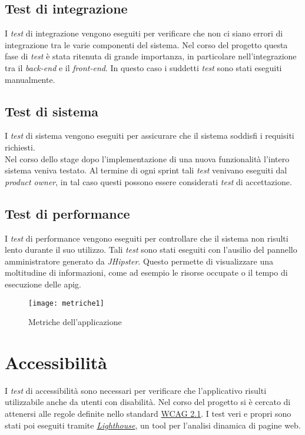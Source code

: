 \subsection{Test di integrazione}
I \textit{test} di integrazione vengono eseguiti per verificare che non ci siano errori di integrazione tra le varie componenti del sistema. Nel corso del progetto questa fase di \textit{test} è stata ritenuta di grande importanza, in particolare nell'integrazione tra il \textit{back-end} e il \textit{front-end}. In questo caso i suddetti \textit{test} sono stati eseguiti manualmente. 

\subsection{Test di sistema}
I \textit{test} di sistema vengono eseguiti per assicurare che il sistema soddisfi i requisiti richiesti. \\Nel corso dello stage dopo l'implementazione di una nuova funzionalità l'intero sistema veniva testato. Al termine di ogni sprint tali \textit{test} venivano eseguiti dal \textit{product owner}, in tal caso questi possono essere considerati \textit{test} di accettazione.

\subsection{Test di performance}
I \textit{test} di performance vengono eseguiti per controllare che il sistema non risulti lento durante il suo utilizzo. Tali \textit{test} sono stati eseguiti con l'ausilio del pannello amministratore generato da \textit{JHipster}. Questo permette di visualizzare una moltitudine di informazioni, come ad esempio le risorse occupate o il tempo di esecuzione delle \gls{apig}.
\begin{figure}[h]
    \begin{center}
    \texttt{[image: metriche1]}
    \caption{Metriche dell'applicazione}
    \label{fig:figure31}
    \end{center}
\end{figure}

\section{Accessibilità}
I \textit{test} di accessibilità sono necessari per verificare che l'applicativo risulti utilizzabile anche da utenti con disabilità. Nel corso del progetto si è cercato di attenersi alle regole definite nello standard \href{https://www.w3.org/TR/WCAG21/}{WCAG 2.1}. I test veri e propri sono stati poi eseguiti tramite \href{https://developers.google.com/web/tools/lighthouse/?utm_source=devtools}{\textit{Lighthouse}}, un tool per l'analisi dinamica di pagine web.